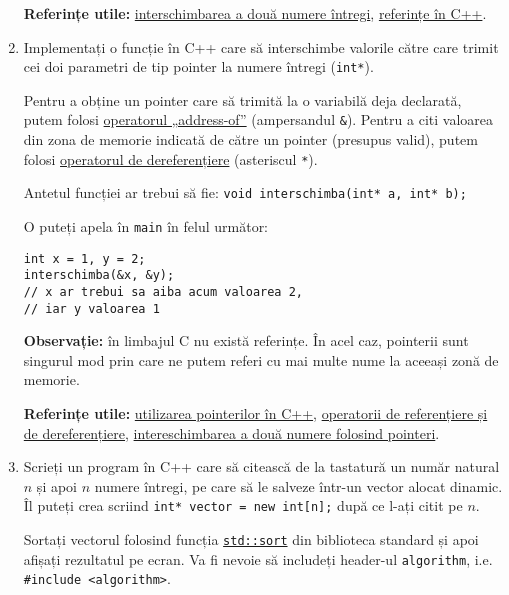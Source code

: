 \begin{enumerate}
    \textbf{Referințe utile:} \href{https://www.programiz.com/cpp-programming/examples/swapping}{interschimbarea a două numere întregi}, \href{https://www.geeksforgeeks.org/references-in-c/}{referințe în C++}.

    \item Implementați o funcție în C++ care să interschimbe valorile către care trimit cei doi parametri de tip pointer la numere întregi (\texttt{int*}).

    Pentru a obține un pointer care să trimită la o variabilă deja declarată, putem folosi \href{https://learn.microsoft.com/en-us/cpp/cpp/address-of-operator-amp?view=msvc-170}{operatorul „address-of”} (ampersandul \texttt{\&}). Pentru a citi valoarea din zona de memorie indicată de către un pointer (presupus valid), putem folosi \href{https://en.wikipedia.org/wiki/Dereference_operator}{operatorul de dereferențiere} (asteriscul \texttt{*}).

    Antetul funcției ar trebui să fie: \texttt{void interschimba(int* a, int* b);}

    O puteți apela în \texttt{main} în felul următor:
    \begin{lstlisting}
int x = 1, y = 2;
interschimba(&x, &y);
// x ar trebui sa aiba acum valoarea 2,
// iar y valoarea 1
    \end{lstlisting}

    \textbf{Observație:} în limbajul C nu există referințe. În acel caz, pointerii sunt singurul mod prin care ne putem referi cu mai multe nume la aceeași zonă de memorie.

    \textbf{Referințe utile:} \href{https://cplusplus.com/doc/tutorial/pointers/}{utilizarea pointerilor în C++}, \href{https://www.geeksforgeeks.org/cpp-dereferencing/}{operatorii de referențiere și de dereferențiere}, \href{https://www.programiz.com/cpp-programming/pointers-function}{intereschimbarea a două numere folosind pointeri}.

    \item Scrieți un program în C++ care să citească de la tastatură un număr natural \(n\) și apoi \(n\) numere întregi, pe care să le salveze într-un vector alocat dinamic. Îl puteți crea scriind \texttt{int* vector = new int[n];} după ce l-ați citit pe \(n\).

    Sortați vectorul folosind funcția \href{https://en.cppreference.com/w/cpp/algorithm/sort}{\texttt{std::sort}} din biblioteca standard și apoi afișați rezultatul pe ecran. Va fi nevoie să includeți header-ul \texttt{algorithm}, i.e. \texttt{\#include <algorithm>}.
    

\end{enumerate}
